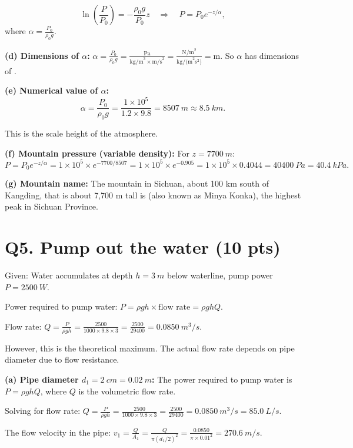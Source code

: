 \documentclass[11pt]{article}
\newcommand{\ans}[1]{\boxed{\displaystyle #1}}
\begin{document}
\[ \ln\left(\frac{P}{P_0}\right) = -\frac{\rho_0 g}{P_0} z \quad\Rightarrow\quad P = P_0 e^{-z/\alpha}, \]
where $\alpha = \frac{P_0}{\rho_0 g}$.

\textbf{(d) Dimensions of $\alpha$:} $\alpha = \frac{P_0}{\rho_0 g} = \frac{\text{Pa}}{\text{kg/m}^3 \times \text{m/s}^2} = \frac{\text{N/m}^2}{\text{kg/(m}^2 \text{s}^2)} = \text{m}$. So $\alpha$ has dimensions of \ans{length (meters)}.

\textbf{(e) Numerical value of $\alpha$:}
\[ \alpha = \frac{P_0}{\rho_0 g} = \frac{1 \times 10^5}{1.2 \times 9.8} = \ans{\SI{8507}{m} \approx \SI{8.5}{km}}. \]

This is the scale height of the atmosphere.

\textbf{(f) Mountain pressure (variable density):} For $z = \SI{7700}{m}$:
\[ P = P_0 e^{-z/\alpha} = 1 \times 10^5 \times e^{-7700/8507} = 1 \times 10^5 \times e^{-0.905} = 1 \times 10^5 \times 0.4044 = \ans{\SI{40400}{Pa} = \SI{40.4}{kPa}}. \]

\textbf{(g) Mountain name:} The mountain in Sichuan, about 100 km south of Kangding, that is about 7,700 m tall is \ans{Mount Gongga} (also known as Minya Konka), the highest peak in Sichuan Province.

\section*{Q5. Pump out the water (10 pts)}
Given: Water accumulates at depth $h = \SI{3}{m}$ below waterline, pump power $P = \SI{2500}{W}$.

Power required to pump water: $P = \rho g h \times \text{flow rate} = \rho g h Q$.

Flow rate: $Q = \frac{P}{\rho g h} = \frac{2500}{1000 \times 9.8 \times 3} = \frac{2500}{29400} = \SI{0.0850}{m^3/s}$.

However, this is the theoretical maximum. The actual flow rate depends on pipe diameter due to flow resistance.

\textbf{(a) Pipe diameter $d_1 = \SI{2}{cm} = \SI{0.02}{m}$:} The power required to pump water is $P = \rho g h Q$, where $Q$ is the volumetric flow rate.

Solving for flow rate: $Q = \frac{P}{\rho g h} = \frac{2500}{1000 \times 9.8 \times 3} = \frac{2500}{29400} = \ans{\SI{0.0850}{m^3/s} = \SI{85.0}{L/s}}$.

The flow velocity in the pipe: $v_1 = \frac{Q}{A_1} = \frac{Q}{\pi (d_1/2)^2} = \frac{0.0850}{\pi \times 0.01^2} = \SI{270.6}{m/s}$.
\end{document}
